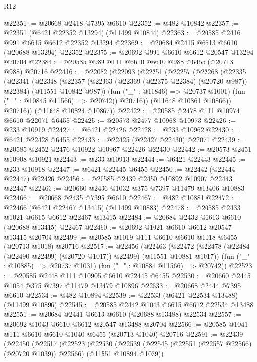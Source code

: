 \begin{lexlean}{R12}
\begin{coremodule}
@22351 := @20668 @2418 @7395 @6610
@22352 := @482 @10842
@22357 := @22351 (@6421 @22352 @13294) (@11499 @10844)
@22363 := @20585 @2416 @991 @6615 @6612 @22352 @13294
@22369 := @20684 @2415 @6613 @6610 (@20688 @13294) @22352
@22375 := @20692 @991 @6610 @6612 @20547 @13294 @20704
@22384 := @20585 @989 @111 @6610 @6610 @988 @6455 (@20713 @988) @20716
@22416 := @22082
    (@22093
      (@22251
        (@22257
          (@22268
            (@22335
              (@22341
                (@22348
                  (@22357
                    (@22363 (@22369 (@22375 @22384) (@20720 @987)) @22384)
                    (@11551 @10842 @987))
                  (fun ("_" : @10846) => @20737 @1001)
                  (fun ("_" : @10845 @11566) => @20742))
                @20716))
            (@11648 @10861 @10866))
          @20716))
      (@11648 @10824 @10867))
@22422 := @20585 @2478 @111 @10974 @6610 @22071 @6455
@22425 := @20573 @2477 @10968 @10973
@22426 := @233 @10919
@22427 := @6421 @22426
@22428 := @233 @10962
@22430 := @6421 @22428 @6455
@22433 := @22425 (@22427 @22430) @22071
@22439 := @20585 @2452 @2476 @10922 @10967 @22426 @22430
@22442 := @20573 @2451 @10908 @10921
@22443 := @233 @10913
@22444 := @6421 @22443
@22445 := @233 @10918
@22447 := @6421 @22445 @6455
@22450 := @22442 (@22444 @22447) @22426
@22456 := @20585 @2439 @2450 @10892 @10907 @22443 @22447
@22463 := @20660 @2436 @1032 @375 @7397 @11479 @13406 @10883
@22466 := @20668 @2435 @7395 @6610
@22467 := @482 @10881
@22472 := @22466 (@6421 @22467 @13415) (@11499 @10883)
@22478 := @20585 @2433 @1021 @6615 @6612 @22467 @13415
@22484 := @20684 @2432 @6613 @6610 (@20688 @13415) @22467
@22490 := @20692 @1021 @6610 @6612 @20547 @13415 @20704
@22499 := @20585 @1019 @111 @6610 @6610 @1018 @6455 (@20713 @1018) @20716
@22517 := @22456
    (@22463
      (@22472 (@22478 (@22484 (@22490 @22499) (@20720 @1017)) @22499) (@11551 @10881 @1017))
      (fun ("_" : @10885) => @20737 @1031)
      (fun ("_" : @10884 @11566) => @20742))
@22523 := @20585 @2448 @111 @10905 @6610 @22445 @6455
@22530 := @20660 @2445 @1054 @375 @7397 @11479 @13479 @10896
@22533 := @20668 @2444 @7395 @6610
@22534 := @482 @10894
@22539 := @22533 (@6421 @22534 @13488) (@11499 @10896)
@22545 := @20585 @2442 @1043 @6615 @6612 @22534 @13488
@22551 := @20684 @2441 @6613 @6610 (@20688 @13488) @22534
@22557 := @20692 @1043 @6610 @6612 @20547 @13488 @20704
@22566 := @20585 @1041 @111 @6610 @6610 @1040 @6455 (@20713 @1040) @20716
@22591 := @22439
    (@22450
      (@22517
        (@22523
          (@22530
            (@22539 (@22545 (@22551 (@22557 @22566) (@20720 @1039)) @22566) (@11551 @10894 @1039))

\end{coremodule}
\end{lexlean}
